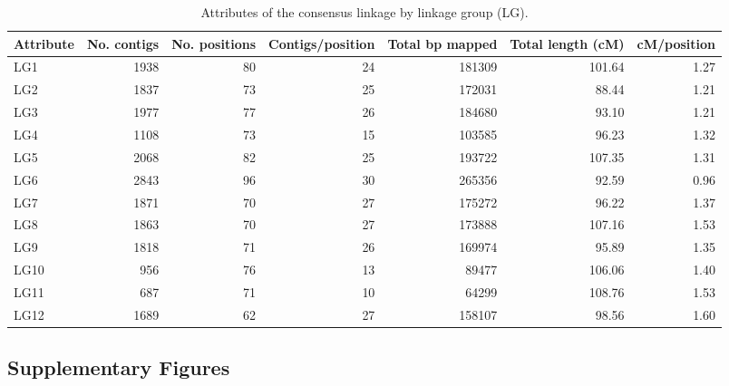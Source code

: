 \documentclass[smallextended]{svjour3}
\begin{document}
\clearpage
\begin{landscape}
\begin{table}[ht]
\caption{Attributes of the consensus linkage by linkage group (LG).} 
\begin{tabular}{lrrrrrr}
\toprule
Attribute & No. contigs & No. positions & Contigs/position & Total bp mapped & Total length (cM) & cM/position \\
\midrule
LG1 & 1938 & 80 & 24 & \num{181309} & 101.64 & 1.27 \\
LG2 & 1837 & 73 & 25 & \num{172031} & 88.44 & 1.21 \\
LG3 & 1977 & 77 & 26 & \num{184680} & 93.10 & 1.21 \\
LG4 & 1108 & 73 & 15 & \num{103585} & 96.23 & 1.32 \\
LG5 & 2068 & 82 & 25 & \num{193722} & 107.35 & 1.31 \\
LG6 & 2843 & 96 & 30 & \num{265356} & 92.59 & 0.96 \\
LG7 & 1871 & 70 & 27 & \num{175272} & 96.22 & 1.37 \\
LG8 & 1863 & 70 & 27 & \num{173888} & 107.16 & 1.53 \\
LG9 & 1818 & 71 & 26 & \num{169974} & 95.89 & 1.35 \\
LG10 & 956 & 76 & 13 & \num{89477} & 106.06 & 1.40 \\
LG11 & 687 & 71 & 10 & \num{64299} & 108.76 & 1.53 \\
LG12 & 1689 & 62 & 27 & \num{158107} & 98.56 & 1.60 \\
\bottomrule
\end{tabular}
\label{t:label}
\end{table}
\end{landscape}

\subsection*{Supplementary Figures}\label{ss:supp}
\end{document}
